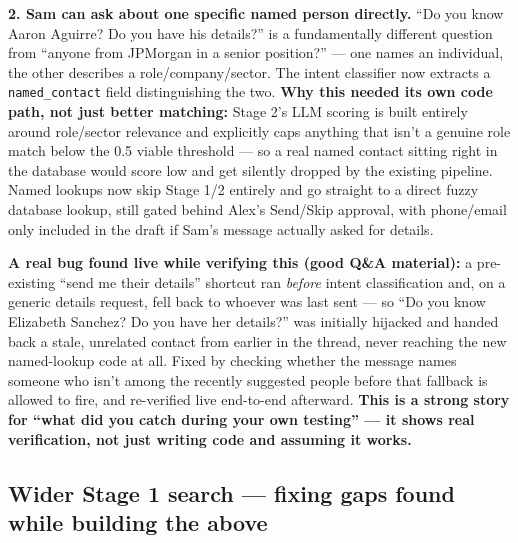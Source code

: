\documentclass[11pt, a4paper]{article}
\begin{document}
\textbf{2. Sam can ask about one specific named person directly.} ``Do you know Aaron Aguirre? Do you have his details?'' is a fundamentally different question from ``anyone from JPMorgan in a senior position?'' --- one names an individual, the other describes a role/company/sector. The intent classifier now extracts a \texttt{named\_contact} field distinguishing the two. \textbf{Why this needed its own code path, not just better matching:} Stage 2's LLM scoring is built entirely around role/sector relevance and explicitly caps anything that isn't a genuine role match below the 0.5 viable threshold --- so a real named contact sitting right in the database would score low and get silently dropped by the existing pipeline. Named lookups now skip Stage 1/2 entirely and go straight to a direct fuzzy database lookup, still gated behind Alex's Send/Skip approval, with phone/email only included in the draft if Sam's message actually asked for details.

\textbf{A real bug found live while verifying this (good Q\&A material):} a pre-existing ``send me their details'' shortcut ran \emph{before} intent classification and, on a generic details request, fell back to whoever was last sent --- so ``Do you know Elizabeth Sanchez? Do you have her details?'' was initially hijacked and handed back a stale, unrelated contact from earlier in the thread, never reaching the new named-lookup code at all. Fixed by checking whether the message names someone who isn't among the recently suggested people before that fallback is allowed to fire, and re-verified live end-to-end afterward. \textbf{This is a strong story for ``what did you catch during your own testing'' --- it shows real verification, not just writing code and assuming it works.}

\subsection{Wider Stage 1 search --- fixing gaps found while building the above}
\label{sec:widersearch}
\end{document}
